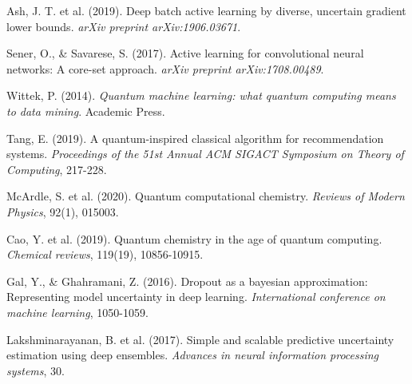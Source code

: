 \documentclass{article}
\begin{document}
\begin{thebibliography}{20}
Ash, J. T. et al. (2019). Deep batch active learning by diverse, uncertain gradient lower bounds. \textit{arXiv preprint arXiv:1906.03671}.

Sener, O., \& Savarese, S. (2017). Active learning for convolutional neural networks: A core-set approach. \textit{arXiv preprint arXiv:1708.00489}.

Wittek, P. (2014). \textit{Quantum machine learning: what quantum computing means to data mining}. Academic Press.

Tang, E. (2019). A quantum-inspired classical algorithm for recommendation systems. \textit{Proceedings of the 51st Annual ACM SIGACT Symposium on Theory of Computing}, 217-228.

McArdle, S. et al. (2020). Quantum computational chemistry. \textit{Reviews of Modern Physics}, 92(1), 015003.

Cao, Y. et al. (2019). Quantum chemistry in the age of quantum computing. \textit{Chemical reviews}, 119(19), 10856-10915.

Gal, Y., \& Ghahramani, Z. (2016). Dropout as a bayesian approximation: Representing model uncertainty in deep learning. \textit{International conference on machine learning}, 1050-1059.

Lakshminarayanan, B. et al. (2017). Simple and scalable predictive uncertainty estimation using deep ensembles. \textit{Advances in neural information processing systems}, 30.

\end{thebibliography}
\end{document}
